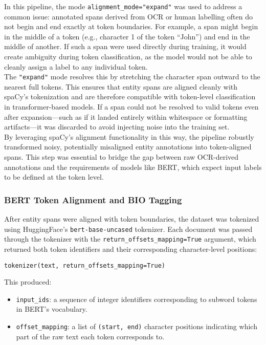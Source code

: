 \documentclass{article}
\begin{document}
In this pipeline, the mode \texttt{alignment\_mode="expand"} was used to address a common issue: annotated spans derived from OCR or human labelling often do not begin and end exactly at token boundaries. For example, a span might begin in the middle of a token (e.g., character 1 of the token ``John'') and end in the middle of another. If such a span were used directly during training, it would create ambiguity during token classification, as the model would not be able to cleanly assign a label to any individual token. \\

The \texttt{"expand"} mode resolves this by stretching the character span outward to the nearest full tokens. This ensures that entity spans are aligned cleanly with spaCy’s tokenization and are therefore compatible with token-level classification in transformer-based models. If a span could not be resolved to valid tokens even after expansion—such as if it landed entirely within whitespace or formatting artifacts—it was discarded to avoid injecting noise into the training set. \\

By leveraging spaCy’s alignment functionality in this way, the pipeline robustly transformed noisy, potentially misaligned entity annotations into token-aligned spans. This step was essential to bridge the gap between raw OCR-derived annotations and the requirements of models like BERT, which expect input labels to be defined at the token level.


\subsubsection{BERT Token Alignment and BIO Tagging}

After entity spans were aligned with token boundaries, the dataset was tokenized using HuggingFace’s \texttt{bert-base-uncased} tokenizer. Each document was passed through the tokenizer with the \texttt{return\_offsets\_mapping=True} argument, which returned both token identifiers and their corresponding character-level positions: \\

\begin{verbatim}
tokenizer(text, return_offsets_mapping=True)
\end{verbatim}

This produced:
\begin{itemize}
    \item \texttt{input\_ids}: a sequence of integer identifiers corresponding to subword tokens in BERT’s vocabulary.
    \item \texttt{offset\_mapping}: a list of \texttt{(start, end)} character positions indicating which part of the raw text each token corresponds to.
\end{itemize}
\end{document}

